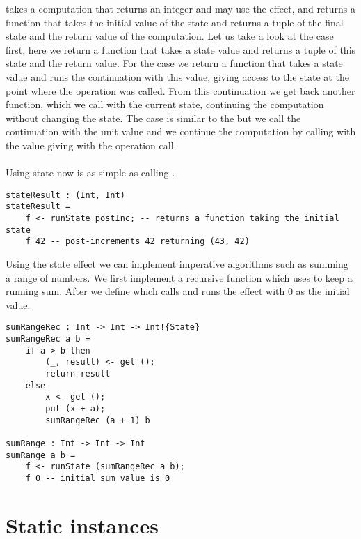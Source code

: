  takes a computation that returns an integer and may use the  effect, and returns a function that takes the initial value of the state and returns a tuple of the final state and the return value of the computation.
Let us take a look at the  case first, here we return a function that takes a state value and returns a tuple of this state and the return value.
For the  case we return a function that takes a state value and runs the continuation  with this value, giving access to the state at the point where the  operation was called. From this continuation we get back another function, which we call with the current state, continuing the computation without changing the state.
The  case is similar to the  but we call the continuation with the unit value and we continue the computation by calling  with the value giving with the  operation call.
\\\\
Using state now is as simple as calling .

\begin{verbatim}
stateResult : (Int, Int)
stateResult =
	f <- runState postInc; -- returns a function taking the initial state
	f 42 -- post-increments 42 returning (43, 42)
\end{verbatim}

Using the state effect we can implement imperative algorithms such as summing a range of numbers.
We first implement a recursive function  which uses  to keep a running sum.
After we define  which calls  and runs the  effect with $0$ as the initial value.

\begin{verbatim}
sumRangeRec : Int -> Int -> Int!{State}
sumRangeRec a b =
	if a > b then
		(_, result) <- get ();
		return result
	else
		x <- get ();
		put (x + a);
		sumRangeRec (a + 1) b
		
sumRange : Int -> Int -> Int
sumRange a b =
	f <- runState (sumRangeRec a b);
	f 0 -- initial sum value is 0
\end{verbatim}

\section{Static instances} \label{section:background-staticinst}

